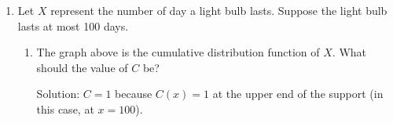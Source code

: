 \documentclass[11pt]{article}
\begin{document}
\begin{enumerate}
\begin{enumerate}
    \item Find $P(X\text{ is even})$.
    
    {
    \color{blue}
    $P(X\text{ is even}) = P(X=2) + P(X=4) = p(2) + p(4) = 0.35+0.3=0.65$
    }
    \vfill

\end{enumerate}


\newpage

%
\item Let $X$ represent the number of day a light bulb lasts. Suppose the light bulb lasts at most 100 days.

\begin{center}
    \end{center}

\begin{enumerate}
    \item The graph above is the cumulative distribution function of $X$. What should the value of $C$ be?

    {\color{blue} Solution: $C = 1$ because $C(x) = 1$ at the upper end of the support (in this case, at $x = 100$).}


\end{enumerate}
\end{enumerate}
\end{document}
